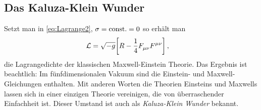 \subsection{Das Kaluza-Klein Wunder}
Setzt man in \eqref{eq:Lagrange2}, $\sigma=\mathrm{const.}=0$  so erhält man 
\begin{equation}\label{eq:Lagrange2}
\begin{split}
\mathcal{L}
&=\sqrt{-g}\left[R-\frac{1}{4}\tensor*{F}{_\mu_\nu}\tensor*{F}{^\mu^\nu}\right]\,,
\end{split}
\end{equation}
die Lagrangedichte der klassischen
Maxwell-Einstein Theorie. 
Das Ergebnis ist beachtlich: Im fünfdimensionalen Vakuum sind die Einstein- und
Maxwell-Gleichungen enthalten.
Mit anderen Worten die Theorien Einsteins
und Maxwells lassen sich in einer einzigen Theorie vereinigen, die von 
überraschender Einfachheit ist. Dieser Umstand ist auch als
\emph{Kaluza-Klein Wunder} bekannt.
% 
%  
%  
